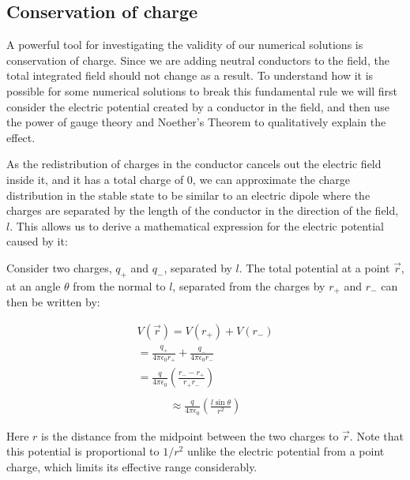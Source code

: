 \documentclass[aps,twocolumn,pre,nofootinbib,10pt]{revtex4-1}
\begin{document}
\subsection{Conservation of charge}

A powerful tool for investigating the validity of our numerical solutions is conservation of charge. Since we are adding neutral conductors to the field, the total integrated field should not change as a result. To understand how it is possible for some numerical solutions to break this fundamental rule we will first consider the electric potential created by a conductor in the field, and then use the power of gauge theory and Noether's Theorem to qualitatively explain the effect.

As the redistribution of charges in the conductor cancels out the electric field inside it, and it has a total charge of 0, we can approximate the charge distribution in the stable state to be similar to an electric dipole where the charges are separated by the length of the conductor in the direction of the field, $l$. This allows us to derive a mathematical expression for the electric potential caused by it:

Consider two charges, $q_+$ and $q_-$, separated by $l$. The total potential at a point $\vec{r}$, at an angle $\theta$ from the normal to $l$, separated from the charges by $r_+$ and $r_-$ can then be written by:

\begin{gather*}
V(\vec{r}) = V(r_+) + V(r_-) \\
 = \frac{q_+}{4 \pi \epsilon_0 r_+} + \frac{q_-}{4 \pi \epsilon_0 r_-} \\
 = \frac{q}{4 \pi \epsilon_0}\left( \frac{r_- - r_+}{r_+ r_-} \right) \\
\end{gather*}
\begin{gather}
 \approx \frac{q}{4 \pi \epsilon_0} \left( \frac{l \sin\theta}{r^2} \right) 
 \label{dipole}
\end{gather}

Here $r$ is the distance from the midpoint between the two charges to $\vec{r}$. Note that this potential is proportional to $1/r^2$ unlike the electric potential from a point charge, which limits its effective range considerably.
\end{document}
